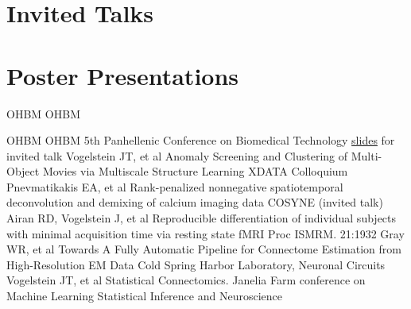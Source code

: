 \documentclass[10pt,colorlinks=true,urlcolor=blue]{moderncv}
\begin{document}
\section{Invited Talks}

\section{Poster Presentations}
 {OHBM}{}{}
 {OHBM} {}{}{}

 {OHBM}{}{}
 {OHBM}{}{}
 {5th Panhellenic Conference on Biomedical Technology} {\href{http://www.slideshare.net/joshuav/knn-connectomeslides}{slides} for invited talk}{}
 {Vogelstein JT, et al} {Anomaly Screening and Clustering of Multi-Object Movies via Multiscale Structure Learning} {XDATA Colloquium} {}{}
 {Pnevmatikakis EA, et al} {Rank-penalized nonnegative spatiotemporal deconvolution and demixing of calcium imaging data} {COSYNE (invited talk)} {} {} 
 {Airan RD, Vogelstein J, et al} {Reproducible differentiation of individual subjects with minimal acquisition time via resting state fMRI} {Proc ISMRM. 21:1932} {} {}
 {Gray WR, et al} {Towards A Fully Automatic Pipeline for Connectome Estimation from High-Resolution EM Data} {Cold Spring Harbor Laboratory, Neuronal Circuits} {} {}
 {Vogelstein JT, et al} {Statistical Connectomics. Janelia Farm conference on Machine Learning} {Statistical Inference and Neuroscience} {}{}
\end{document}
